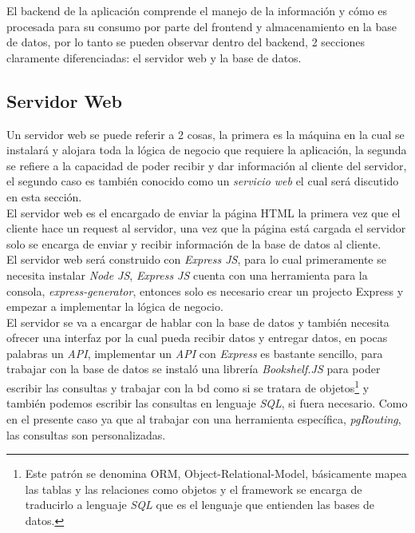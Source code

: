 El backend de la aplicación comprende el manejo de la información y cómo es procesada para su consumo por parte del frontend y almacenamiento en la base de datos, por lo tanto se pueden observar dentro del backend, 2 secciones claramente diferenciadas: el servidor web y la base de datos.\\




\subsection{Servidor Web}
\label{sub:servidor_web}

Un servidor web se puede referir a 2 cosas, la primera es la máquina en la cual se instalará y alojara toda la lógica de negocio que requiere la aplicación, la segunda se refiere a la capacidad de poder recibir y dar información al cliente del servidor, el segundo caso es también conocido como un \emph{servicio web} el cual será discutido en esta sección.\\

El servidor web es el encargado de enviar la página HTML la primera vez que el cliente hace un request al servidor, una vez que la página está cargada el servidor solo se encarga de enviar y recibir información de la base de datos al cliente.\\

El servidor web será construido con \emph{Express JS}, para lo cual primeramente se necesita instalar \emph{Node JS}, \emph{Express JS} cuenta con una herramienta para la consola, \emph{express-generator}, entonces solo es necesario crear un projecto Express y empezar a implementar la lógica de negocio.\\

El servidor se va a encargar de hablar con la base de datos y también necesita ofrecer una interfaz por la cual pueda recibir datos y entregar datos, en pocas palabras un \emph{API}, implementar un \emph{API} con \emph{Express} es bastante sencillo, para trabajar con la base de datos se instaló una librería \emph{Bookshelf.JS} para poder escribir las consultas y trabajar con la bd como si se tratara de objetos\footnote{Este patrón se denomina ORM, Object-Relational-Model, básicamente mapea las tablas y las relaciones como objetos y el framework se encarga de traducirlo a lenguaje \emph{SQL} que es el lenguaje que entienden las bases de datos.} y también podemos escribir las consultas en lenguaje \emph{SQL}, si fuera necesario. Como en el presente caso ya que al  trabajar con una herramienta específica, \emph{pgRouting}, las consultas son personalizadas.\\

